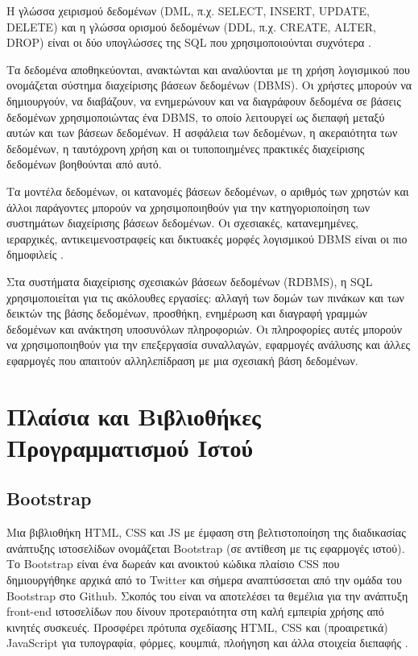 Η γλώσσα χειρισμού δεδομένων (DML, π.χ. SELECT, INSERT, UPDATE, DELETE) και η γλώσσα ορισμού δεδομένων (DDL, π.χ. CREATE, ALTER, DROP) είναι οι δύο υπογλώσσες της SQL που χρησιμοποιούνται συχνότερα \cite{taipalus2020sql}.
 
Τα δεδομένα αποθηκεύονται, ανακτώνται και αναλύονται με τη χρήση λογισμικού που ονομάζεται σύστημα διαχείρισης βάσεων δεδομένων (DBMS). Οι χρήστες μπορούν να δημιουργούν, να διαβάζουν, να ενημερώνουν και να διαγράφουν δεδομένα σε βάσεις δεδομένων χρησιμοποιώντας ένα DBMS, το οποίο λειτουργεί ως διεπαφή μεταξύ αυτών και των βάσεων δεδομένων. Η ασφάλεια των δεδομένων, η ακεραιότητα των δεδομένων, η ταυτόχρονη χρήση και οι τυποποιημένες πρακτικές διαχείρισης δεδομένων βοηθούνται από αυτό.

Τα μοντέλα δεδομένων, οι κατανομές βάσεων δεδομένων, ο αριθμός των χρηστών και άλλοι παράγοντες μπορούν να χρησιμοποιηθούν για την κατηγοριοποίηση των συστημάτων διαχείρισης βάσεων δεδομένων. Οι σχεσιακές, κατανεμημένες, ιεραρχικές, αντικειμενοστραφείς και δικτυακές μορφές λογισμικού DBMS είναι οι πιο δημοφιλείς \cite{DBMS}.

Στα συστήματα διαχείρισης σχεσιακών βάσεων δεδομένων (RDBMS), η SQL χρησιμοποιείται για τις ακόλουθες εργασίες: αλλαγή των δομών των πινάκων και των δεικτών της βάσης δεδομένων, προσθήκη, ενημέρωση και διαγραφή γραμμών δεδομένων και ανάκτηση υποσυνόλων πληροφοριών. Οι πληροφορίες αυτές μπορούν να χρησιμοποιηθούν για την επεξεργασία συναλλαγών, εφαρμογές ανάλυσης και άλλες εφαρμογές που απαιτούν αλληλεπίδραση με μια σχεσιακή βάση δεδομένων.

\section{Πλαίσια και Βιβλιοθήκες Προγραμματισμού Ιστού}

\subsection{Bootstrap}
Μια βιβλιοθήκη HTML, CSS και JS με έμφαση στη βελτιστοποίηση της διαδικασίας ανάπτυξης ιστοσελίδων ονομάζεται Bootstrap (σε αντίθεση με τις εφαρμογές ιστού). Το Bootstrap είναι ένα δωρεάν και ανοικτού κώδικα πλαίσιο CSS που δημιουργήθηκε αρχικά από το Twitter και σήμερα αναπτύσσεται από την ομάδα του Bootstrap στο Github. Σκοπός του είναι να αποτελέσει τα θεμέλια για την ανάπτυξη front-end ιστοσελίδων που δίνουν προτεραιότητα στη καλή εμπειρία χρήσης από κινητές συσκευές. Προσφέρει πρότυπα σχεδίασης HTML, CSS και (προαιρετικά) JavaScript για τυπογραφία, φόρμες, κουμπιά, πλοήγηση και άλλα στοιχεία διεπαφής \cite{Bootstrap}. 

